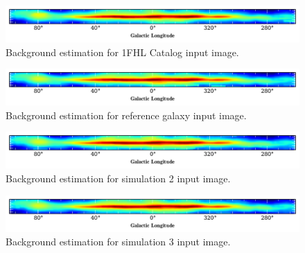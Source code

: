 \documentclass{PoS}
\begin{document}
\begin{figure}
  \begin{center}
      \includegraphics[width=\textwidth]{figures/BG_1FHL.pdf}
  \caption{Background estimation for 1FHL Catalog input image.}
  \end{center}
\end{figure}

\begin{figure}
  \begin{center}
      \includegraphics[width=\textwidth]{figures/BG_SIM1.pdf}
  \caption{Background estimation for reference galaxy input image.}
  \end{center}
\end{figure}

\begin{figure}
  \begin{center}
      \includegraphics[width=\textwidth]{figures/BG_SIM2.pdf}
  \caption{Background estimation for simulation 2 input image.}
  \end{center}
\end{figure}

\begin{figure}
  \begin{center}
      \includegraphics[width=\textwidth]{figures/BG_SIM3.pdf}
  \caption{Background estimation for simulation 3 input image.}
  \end{center}
\end{figure}
\end{document}
